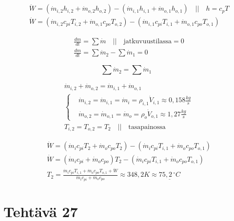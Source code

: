 \documentclass[12pt,a4paper,finnish]{article}
\begin{document}
\begin{align}
 & \dot{W} = (\dot{m}_{i,2}h_{i,2} + \dot{m}_{o,2}h_{o,2}) - (\dot{m}_{i,1}h_{i,1} + \dot{m}_{o,1}h_{o,1}) 
  \quad \bigg|\bigg| \quad h = c_pT \\
 & \dot{W} = (\dot{m}_{i,2}c_{pi}T_{i,2} + \dot{m}_{o,1}c_{po}T_{o,2}) 
  - (\dot{m}_{i,1}c_{pi}T_{i,1} + \dot{m}_{o,1}c_{po}T_{o,1})
\end{align}

\begin{align}
 & \frac{dm}{dt} = \sum \dot{m} \quad \bigg|\bigg| \quad \text{jatkuvuustilassa} = 0\\
 & \frac{dm}{dt} = \sum \dot{m}_2 - \sum \dot{m}_1 = 0
\end{align}
  
\begin{framed}
 \begin{equation}
  \sum \dot{m}_2 = \sum \dot{m}_1
 \end{equation}
\end{framed} 

\begin{align}
 & \dot{m}_{i,2} + \dot{m}_{o,2} = \dot{m}_{i,1} + \dot{m}_{o,1} \\
 &\left\{
 \begin{aligned}
  & \dot{m}_{i,2} = \dot{m}_{i,1} = \dot{m}_i = \rho_{i,1}\dot{V}_{i,1} \approx 0,158\frac{kg}{s}\\
  & \dot{m}_{o,2} = \dot{m}_{o,1} = \dot{m}_o = \rho_{o}\dot{V}_{o,1} \approx 1,27\frac{kg}{s}
 \end{aligned}\right.\\
 & T_{i,2} = T_{o,2} = T_2 \quad \bigg|\bigg| \quad \text{tasapainossa}
\end{align}
 
\begin{align}
 & \dot{W} = (\dot{m}_ic_{pi}T_2 + \dot{m}_oc_{po}T_2) 
  - (\dot{m}_ic_{pi}T_{i,1} + \dot{m}_oc_{po}T_{o,1})\\
 & \dot{W} = (\dot{m}_ic_{pi} + \dot{m}_oc_{po})T_2 
  - (\dot{m}_ic_{pi}T_{i,1} + \dot{m}_oc_{po}T_{o,1})\\
 & T_2 = \frac{\dot{m}_ic_{pi}T_{i,1} + \dot{m}_oc_{po}T_{o,1} + \dot{W}}{\dot{m}_ic_{pi} + \dot{m}_oc_{po}}
  \approx 348,2 K \approx \underline{75,2\,^{\circ}C}
\end{align}

\section{Tehtävä 27}
\end{document}
